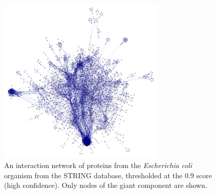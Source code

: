 \begin{figure}
\includegraphics[height=8cm]{ecoli_giant_at_900.png}
\caption{An interaction network of proteins from the \textit{Escherichia coli} organism from the STRING database, thresholded at the $0.9$ score (high confidence). Only nodes of the giant component are shown.}
\label{fig:ecoli_giant_at_900}
\end{figure}
